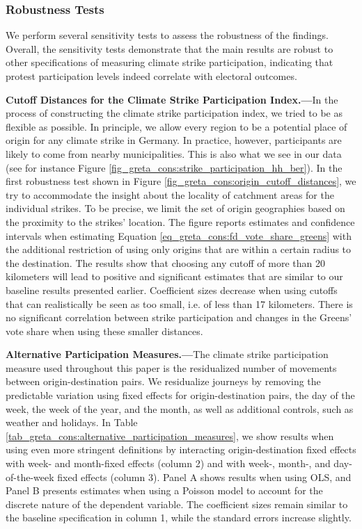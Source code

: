 \subsubsection{Robustness Tests}

We perform several sensitivity tests to assess the robustness of the findings. Overall, the sensitivity tests demonstrate that the main results are robust to other specifications of measuring climate strike participation, indicating that protest participation levels indeed correlate with electoral outcomes.



\textbf{Cutoff Distances for the Climate Strike Participation Index.---}In the process of constructing the climate strike participation index, we tried to be as flexible as possible. In principle, we allow every region to be a potential place of origin for any climate strike in Germany. In practice, however, participants are likely to come from nearby municipalities. This is also what we see in our data (see for instance Figure \ref{fig_greta_cons:strike_participation_hh_ber}). In the first robustness test shown in Figure \ref{fig_greta_cons:origin_cutoff_distances}, we try to accommodate the insight about the locality of catchment areas for the individual strikes. To be precise, we limit the set of origin geographies based on the proximity to the strikes' location. The figure reports estimates and confidence intervals when estimating Equation \ref{eq_greta_cons:fd_vote_share_greens} with the additional restriction of using only origins that are within a certain radius to the destination. The results show that choosing any cutoff of more than 20 kilometers will lead to positive and significant estimates that are similar to our baseline results presented earlier. Coefficient sizes decrease when using cutoffs that can realistically be seen as too small, i.e. of less than 17 kilometers. There is no significant correlation between strike participation and changes in the Greens' vote share when using these smaller distances.


\textbf{Alternative Participation Measures.---}The climate strike participation measure used throughout this paper is the residualized number of movements between origin-destination pairs. We residualize journeys by removing the predictable variation using fixed effects for origin-destination pairs, the day of the week, the week of the year, and the month, as well as additional controls, such as weather and holidays. In Table \ref{tab_greta_cons:alternative_participation_measures}, we show results when using even more stringent definitions by interacting origin-destination fixed effects with week- and month-fixed effects (column 2) and with week-, month-, and day-of-the-week fixed effects (column 3). Panel A shows results when using OLS, and Panel B presents estimates when using a Poisson model to account for the discrete nature of the dependent variable. The coefficient sizes remain similar to the baseline specification in column 1, while the standard errors increase slightly.


